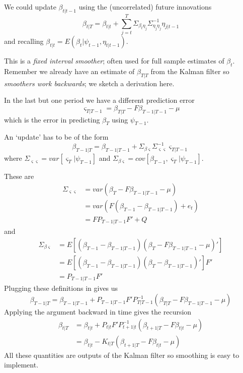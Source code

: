 \documentclass[
  letterpaper,
]{book}
\begin{document}
We could update \(\beta_{t|t-1}\) using the (uncorrelated) future
innovations \begin{equation}
  \beta_{t|T}=\beta_{t|t}+\sum_{j=t}^T\Sigma_{\beta_t\eta_j}\Sigma_{\eta_j\eta_j}^{-1}\eta_{j|t-1}
\end{equation} and recalling
\(\beta_{t|t}=E(\beta_t|\psi_{t-1},\eta_{t|t-1})\).

This is a \emph{fixed interval smoother}; often used for full sample
estimates of \(\beta_t\). Remember we already have an estimate of
\(\beta_{T|T}\) from the Kalman filter so \emph{smoothers work
backwards}; we sketch a derivation here.

In the last but one period we have a different prediction error
\begin{equation}
   \varsigma_{T|T-1} = \beta_{T|T} - F\beta_{T-1|T-1} - \mu
\end{equation} which is the error in predicting \(\beta_T\) using
\(\psi_{T-1}\).

An `update' has to be of the form \begin{equation}
\beta_{T-1|T}=\beta_{T-1|T-1} + \Sigma_{\beta\varsigma}\Sigma_{\varsigma\varsigma}^{-1}\varsigma_{T|T-1}
\end{equation} where
\(\Sigma_{\varsigma\varsigma} = var\left[ \varsigma_T|\psi_{T-1}\right]\)
and
\(\Sigma_{\beta \varsigma}=cov\left[\beta_{T-1},\varsigma_T|\psi_{T-1}\right]\).

These are \begin{align}
\Sigma_{\varsigma\varsigma} &= var(\beta_T - F\beta_{T-1|T-1}-\mu) \\
  &= var\left(F(\beta_{T-1}-\beta_{T-1|T-1}) + e_t \right) \\
  &= F P_{T-1|T-1}F' + Q
\end{align} and \begin{align}
\Sigma_{\beta\varsigma} &= E\left[ (\beta_{T-1}-\beta_{T-1|T-1}) \left( \beta_T - F\beta_{T-1|T-1}-\mu \right)'
\right] \\
&= E\left[ (\beta_{T-1}-\beta_{T-1|T-1}) (\beta_T-\beta_{T-1|T-1})'\right] F' \\
&= P_{T-1|T-1}F'
\end{align} Plugging these definitions in gives us \begin{equation}
\beta_{T-1|T} = \beta_{T-1|T-1} + P_{T-1|T-1}F' P_{T|T-1}^{-1} (\beta_{T|T}-F\beta_{T-1|T-1}-\mu)
\end{equation} Applying the argument backward in time gives the
recursion \begin{align}
\beta_{t|T} &= \beta_{t|t}+P_{t|t} F'P_{t+1|t}^{-1} (\beta_{t+1|T}-F\beta_{t|t}-\mu) \\
&= \beta_{t|t} - K_{t|T} (\beta_{t+1|T}-F\beta_{t|t}-\mu) \tag{smooth}
\end{align} All these quantities are outputs of the Kalman filter so
smoothing is easy to implement.
\end{document}
